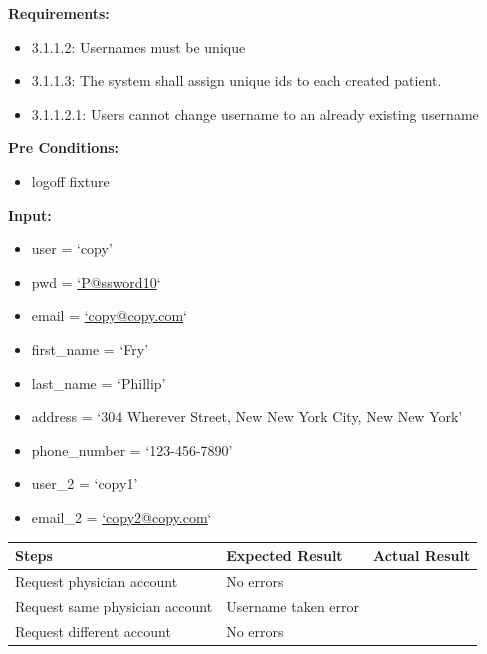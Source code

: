\documentclass[letterpaper,10pt,english]{sphinxmanual}
\begin{document}
\begin{fulllineitems}
\label{STD/test_username:test_username.test_username_cannot_be_copied}
\textbf{Requirements:}
\begin{itemize}
\item {} 
3.1.1.2: Usernames must be unique

\item {} 
3.1.1.3: The system shall assign unique ids to each created patient.

\item {} 
3.1.1.2.1: Users cannot change username to an already existing username

\end{itemize}

\textbf{Pre Conditions:}
\begin{itemize}
\item {} 
logoff fixture

\end{itemize}

\textbf{Input:}
\begin{itemize}
\item {} 
user = `copy'

\item {} 
pwd = \href{mailto:'P@ssword10}{`P@ssword10}`

\item {} 
email = \href{mailto:'copy@copy.com}{`copy@copy.com}`

\item {} 
first\_name = `Fry'

\item {} 
last\_name = `Phillip'

\item {} 
address = `304 Wherever Street, New New York City, New New York'

\item {} 
phone\_number = `123-456-7890'

\item {} 
user\_2 = `copy1'

\item {} 
email\_2 = \href{mailto:'copy2@copy.com}{`copy2@copy.com}`

\end{itemize}

\begin{tabulary}{\linewidth}{|L|L|L|}
\hline
\textsf{\relax 
Steps
} & \textsf{\relax 
Expected Result
} & \textsf{\relax 
Actual Result
}\\
\hline
Request physician account
 & 
No errors
 & \\
\hline
Request same physician account
 & 
Username taken error
 & \\
\hline
Request different account
 & 
No errors
 & \\
\hline\end{tabulary}


\end{fulllineitems}
\end{document}
